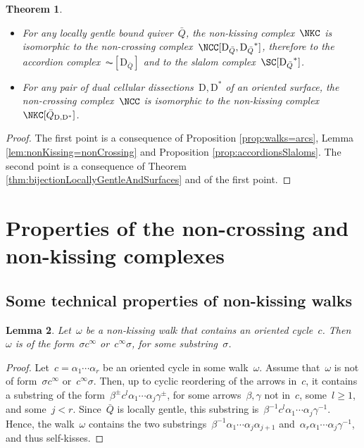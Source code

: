 \documentclass{amsart}
\newtheorem{theorem}{Theorem}[section]
\newtheorem{lemma}[theorem]{Lemma}
\theoremstyle{definition}
\newcommand{\dual}{^*} %
\newcommand{\dissection}{\mathrm{D}} %
\begin{document}
\begin{theorem}
\label{thm:complexesCoincide}
\begin{itemize}
\item For any locally gentle bound quiver~$\bar Q$, the non-kissing complex~$\NKC$ is isomorphic to the non-crossing complex~$\NCC[\dissection_{\bar Q}, {\dissection_{\bar Q}}\dual]$, therefore to the accordion complex~$\AC[\dissection_{\bar Q}]$ and to the slalom complex~$\SC[{\dissection_{\bar Q}}\dual]$.
\item For any pair of dual cellular dissections~$\dissection, \dissection\dual$ of an oriented surface, the non-crossing complex~$\NCC$ is isomorphic to the non-kissing complex~$\NKC[\bar Q_{\dissection, \dissection\dual}]$.
\end{itemize}
\end{theorem}
\begin{proof}
 The first point is a consequence of Proposition \ref{prop:walks=arcs}, Lemma \ref{lem:nonKissing=nonCrossing} and Proposition \ref{prop:accordionsSlaloms}.
 The second point is a consequence of Theorem \ref{thm:bijectionLocallyGentleAndSurfaces} and of the first point.
\end{proof}


\section{Properties of the non-crossing and non-kissing complexes}

\subsection{Some technical properties of non-kissing walks}

\begin{lemma}\label{lem:nkCycles}
 Let~$\omega$ be a non-kissing walk that contains an oriented cycle~$c$.
 Then~$\omega$ is of the form~$\sigma c^\infty$ or~$c^\infty\sigma$, for some substring~$\sigma$.
\end{lemma}

\begin{proof}
 Let~$c=\alpha_1\cdots\alpha_r$ be an oriented cycle in some walk~$\omega$.
 Assume that~$\omega$ is not of form~$\sigma c^\infty$ or~$c^\infty\sigma$.
 Then, up to cyclic reordering of the arrows in~$c$, it contains a substring of the form~$\beta^\pm c^l \alpha_1\cdots\alpha_j\gamma^\pm$, for some arrows~$\beta,\gamma$ not in~$c$, some~$l\geq 1$, and some~$j<r$.
 Since~$\bar Q$ is locally gentle, this substring is~$\beta^{-1} c^l \alpha_1\cdots\alpha_j\gamma^{-1}$.
 Hence, the walk~$\omega$ contains the two substrings~$\beta^{-1}\alpha_1\cdots\alpha_j\alpha_{j+1}$ and~$\alpha_r\alpha_1\cdots\alpha_j\gamma^{-1}$, and thus self-kisses.
\end{proof}
\end{document}
